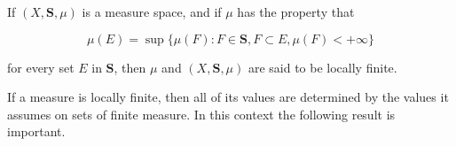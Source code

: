 If $(X, \mathbf{S}, \mu)$ is a measure space, and if $\mu$ has the property that

$$\mu(E) = \sup \{ \mu(F) : F \in \mathbf{S}, F \subset E, \mu(F) < +\infty \}$$

for every set $E$ in $\mathbf{S}$, then $\mu$ and $(X, \mathbf{S}, \mu)$ are said to be locally finite.

If a measure is locally finite, then all of its values are determined by the values it assumes on sets of finite measure. In this context the following result is important.
